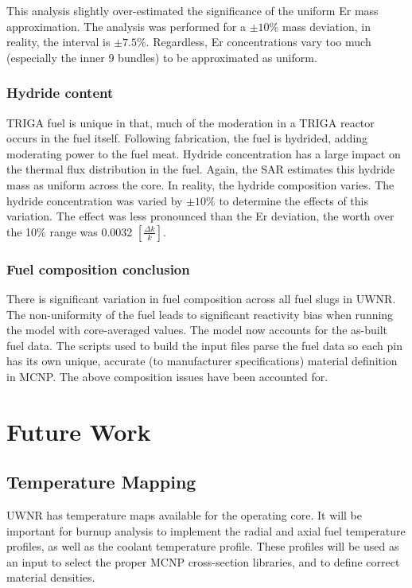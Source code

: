 \documentclass{UWNR_modeling}
\begin{document}
This analysis slightly over-estimated the significance of the uniform Er mass approximation. The analysis was performed for a $\pm 10\%$ mass deviation, in reality, the interval is $\pm 7.5\%$. Regardless, Er concentrations vary too much (especially the inner 9 bundles) to be approximated as uniform.

\subsubsection{Hydride content}

TRIGA fuel is unique in that, much of the moderation in a TRIGA reactor occurs in the fuel itself. Following fabrication, the fuel is hydrided, adding moderating power to the fuel meat. Hydride concentration has a large impact on the thermal flux distribution in the fuel. Again, the SAR estimates this hydride mass as uniform across the core. In reality, the hydride composition varies. The hydride concentration was varied by $\pm 10\%$ to determine the effects of this variation. The effect was less pronounced than the Er deviation, the worth over the 10\% range was 0.0032 $[\frac{\Delta k}{k}]$.

\subsubsection{Fuel composition conclusion}

There is significant variation in fuel composition across all fuel slugs in UWNR. The non-uniformity of the fuel leads to significant reactivity bias when running the model with core-averaged values. The model now accounts for the as-built fuel data. The scripts used to build the input files parse the fuel data so each pin has its own unique, accurate (to manufacturer specifications) material definition in MCNP. The above composition issues have been accounted for.
 

\section{Future Work}

\subsection{Temperature Mapping}

UWNR has temperature maps available for the operating core. It will be important for burnup analysis to implement the radial and axial fuel temperature profiles, as well as the coolant temperature profile. These profiles will be used as an input to select the proper MCNP cross-section libraries, and to define correct material densities. 
\end{document}
